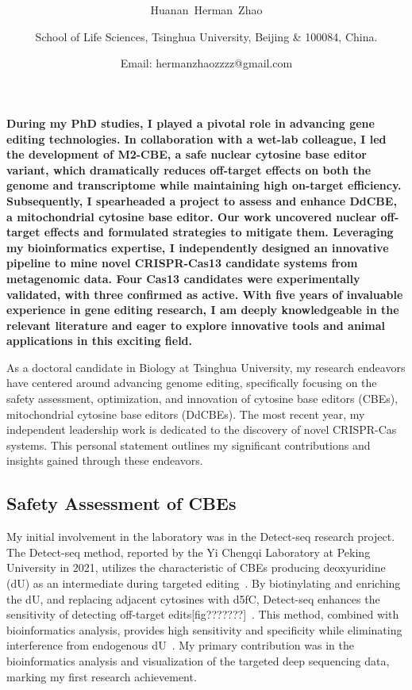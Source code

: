 \documentclass[12pt]{article}
\date{}
\title{\bfseries \boldmath \scititle}
\author{
	Huanan~Herman~Zhao\and
	\small School of Life Sciences, Tsinghua University, Beijing \& 100084, China.\and
	\small \hspace{3em} Email: hermanzhaozzzz@gmail.com\and
}
\renewenvironment{abstract}
	{\quotation}
	{\endquotation}
\begin{document}
 

\maketitle

\begin{abstract} \bfseries \boldmath
    During my PhD studies, I played a pivotal role in advancing gene editing technologies. 
    In collaboration with a wet-lab colleague, I led the development of M2-CBE, a safe nuclear cytosine base editor variant, 
    which dramatically reduces off-target effects on both the genome and transcriptome while maintaining high on-target efficiency. 
    Subsequently, I spearheaded a project to assess and enhance DdCBE, a mitochondrial cytosine base editor. 
    Our work uncovered nuclear off-target effects and formulated strategies to mitigate them. 
    Leveraging my bioinformatics expertise, I independently designed an innovative pipeline to mine novel CRISPR-Cas13 candidate systems from metagenomic data. 
    Four Cas13 candidates were experimentally validated, with three confirmed as active. 
    With five years of invaluable experience in gene editing research,
    I am deeply knowledgeable in the relevant literature and eager to explore innovative tools and animal applications in this exciting field.  
\end{abstract}



\noindent  
As a doctoral candidate in Biology at Tsinghua University, 
my research endeavors have centered around advancing genome editing, 
specifically focusing on the safety assessment, optimization, 
and innovation of cytosine base editors (CBEs), mitochondrial cytosine base editors (DdCBEs).
The most recent year, my independent leadership work is dedicated to the discovery of novel CRISPR-Cas systems. 
This personal statement outlines my significant contributions and insights gained through these endeavors.  

\subsection*{Safety Assessment of CBEs}
My initial involvement in the laboratory was in the Detect-seq research project.
The Detect-seq method, reported by the Yi Chengqi Laboratory at Peking University in 2021, 
utilizes the characteristic of CBEs producing deoxyuridine (dU) as an intermediate during targeted editing~\cite{lei2021detect}. 
By biotinylating and enriching the dU, and replacing adjacent cytosines with d5fC, 
Detect-seq enhances the sensitivity of detecting off-target edits[fig???????]~\cite{lei2021detect}. 
This method, combined with bioinformatics analysis, 
provides high sensitivity and specificity while eliminating interference from endogenous dU~\cite{lei2021detect,lei2022mitochondrial,lei2023detect}.  
My primary contribution was in the bioinformatics analysis and visualization of the targeted deep sequencing data, 
marking my first research achievement.  
  
\end{document}
